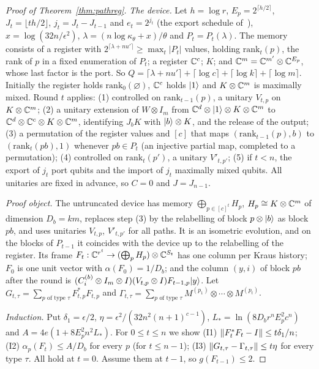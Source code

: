 \begin{proof}[Proof of Theorem~\ref{thm:pathreg}]
\emph{The device.} Let $h=\log r$, $E_p=2^{\lceil h/2\rceil}$, $J_t=\lfloor th/2\rfloor$, $j_t=J_t-J_{t-1}$ and $e_t=2^{j_t}$ (the export schedule
of~\cite[Theorem~12.2]{DouglasMghirbiC}), $x=\log(32n/\epsilon^2)$, $\lambda=(n\log\kappa_\theta+x)/\theta$ and $P_t=P_t(\lambda)$. The memory consists of a register
with $2^{\lceil\lambda+nu'\rceil}\ge\max_t|P_t|$ values, holding $\mathrm{rank}_t(p)$, the rank of $p$ in a fixed enumeration of $P_t$; a register $\mathbb C^c$; $K$; and
$\mathbb C^m=\mathbb C^{m'}\otimes\mathbb C^{E_p}$, whose last factor is the port. So $Q=\lceil\lambda+nu'\rceil+\lceil\log c\rceil+\lceil\log k\rceil+\lceil\log m\rceil$. Initially the register
holds $\mathrm{rank}_0(\varnothing)$, $\mathbb C^c$ holds $\lvert 1\rangle$ and $K\otimes\mathbb C^m$ is maximally mixed. Round $t$ applies: (1) controlled on $\mathrm{rank}_{t-1}(p)$, a unitary
$V_{t,p}$ on $K\otimes\mathbb C^m$; (2) a unitary extension of $W\otimes I_m$ from $\mathbb C^d\otimes\lvert 1\rangle\otimes K\otimes\mathbb C^m$ to $\mathbb C^d\otimes\mathbb C^c\otimes K\otimes\mathbb C^m$, identifying
$J_bK$ with $\lvert b\rangle\otimes K$, and the release of the output; (3) a permutation of the register values and $[c]$ that maps $(\mathrm{rank}_{t-1}(p),b)$ to
$(\mathrm{rank}_t(pb),1)$ whenever $pb\in P_t$ (an injective partial map, completed to a permutation); (4) controlled on $\mathrm{rank}_t(p')$, a unitary $V'_{t,p'}$; (5) if
$t<n$, the export of $j_t$ port qubits and the import of $j_t$ maximally mixed qubits. All unitaries are fixed in advance, so $C=0$ and $J=J_{n-1}$.

\emph{Proof object.} The untruncated device has memory $\bigoplus_{p\in[c]^t}H_p$, $H_p\cong K\otimes\mathbb C^m$ of dimension $D_b=km$, replaces step (3) by the relabelling
of block $p\otimes\lvert b\rangle$ as block $pb$, and uses unitaries $V_{t,p}$, $V'_{t,p'}$ for all paths. It is an isometric evolution, and on the blocks of $P_{t-1}$ it
coincides with the device up to the relabelling of the register. Its frame $F_t:\mathbb C^{r^t}\to(\bigoplus_pH_p)\otimes\mathbb C^{S_t}$ has one column per Kraus history;
$F_0$ is one unit vector with $\alpha(F_0)=1/D_b$; and the column $(y,i)$ of block $pb$ after the round is $(C^{(b)}_i\otimes I_m\otimes I)(V_{t,p}\otimes I)F_{t-1,p}\lvert y\rangle$.
Let $G_{t,\tau}=\sum_{p\text{ of type }\tau}F_{t,p}^*F_{t,p}$ and $\Gamma_{t,\tau}=\sum_{p\text{ of type }\tau}M^{(p_1)}\otimes\cdots\otimes M^{(p_t)}$.

\emph{Induction.} Put $\delta_1=\epsilon/2$, $\eta=\epsilon^2/(32n^2(n+1)^{c-1})$, $L_*=\ln(8D_br^nE_p^2c^n)$ and $A=4e(1+8E_p^2n^2L_*)$. For $0\le t\le n$ we show
(I1) $\lVert F_t^*F_t-I\rVert\le t\delta_1/n$; (I2) $\alpha_p(F_t)\le A/D_b$ for every $p$ (for $t\le n-1$); (I3) $\lVert G_{t,\tau}-\Gamma_{t,\tau}\rVert\le t\eta$ for every type
$\tau$. All hold at $t=0$. Assume them at $t-1$, so $g(F_{t-1})\le2$.


\end{proof}

